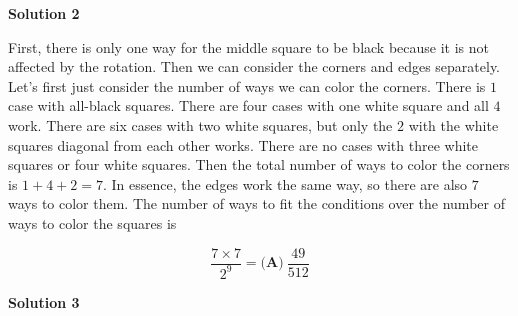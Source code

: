 \begin{enumerate}
 



\textbf{Solution 2}

First, there is only one way for the middle square to be black because it is not affected by the rotation. Then we can consider the corners and edges separately. Let's first just consider the number of ways we can color the corners. There is $1$ case with all-black squares. There are four cases with one white square and all $4$ work. There are six cases with two white squares, but only the $2$ with the white squares diagonal from each other works. There are no cases with three white squares or four white squares. Then the total number of ways to color the corners is $1+4+2=7$. In essence, the edges work the same way, so there are also $7$ ways to color them. The number of ways to fit the conditions over the number of ways to color the squares is

 
 \[\frac{7\times7}{2^9}=\boxed{\textbf{(A)}\ \frac{49}{512}}\]




\textbf{Solution 3}


\end{enumerate}

